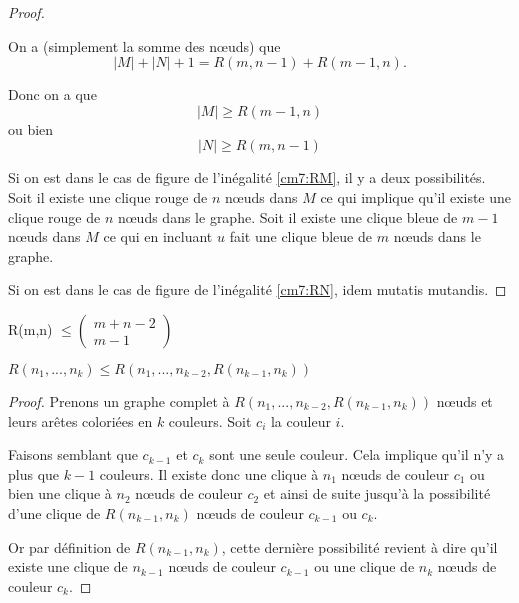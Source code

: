 \begin{mytheo} 
\begin{proof}
\begin{figure} [!h]
\end{figure}   
     
 On a (simplement la somme des nœuds) que
 $$|M|+|N|+1 = R(m,n-1) + R(m-1,n).$$
 
 Donc on a que
 \begin{equation} \label{cm7:RM}
 |M| \geq R(m-1,n)
\end{equation}
ou bien
\begin{equation} \label{cm7:RN}
 |N| \geq R(m,n-1)
\end{equation}

Si on est dans le cas de figure de l'inégalité \ref{cm7:RM}, il y a deux possibilités. Soit il existe une clique rouge de $n$ nœuds dans $M$ ce qui implique qu'il existe une clique rouge de $n$ nœuds dans le graphe. Soit il existe une clique bleue de $m-1$ nœuds dans $M$ ce qui en incluant $u$ fait une clique bleue de $m$ nœuds dans le graphe.

Si on est dans le cas de figure de l'inégalité \ref{cm7:RN}, idem mutatis mutandis.
  \end{proof}
\end{mytheo}

\begin{mycorr} R(m,n) $\leq \begin{pmatrix}
m+n-2\\
m-1
\end{pmatrix}$\\
\end{mycorr}

\begin{mytheo}
$R(n_1,...,n_k) \leq R \left( n_1,...,n_{k-2},R(n_{k-1},n_k) \right)$

\begin{proof}
  Prenons un graphe complet à $R(n_1, ..., n_{k-2}, R(n_{k-1}, n_k))$ nœuds et leurs arêtes coloriées en $k$ couleurs. Soit $c_i $ la couleur $i$.
  
  Faisons semblant que $c_{k-1}$ et $c_{k}$ sont une seule couleur. Cela implique qu'il n'y a plus que $k-1$ couleurs. Il existe donc une clique à $n_1$ nœuds de couleur $c_1$ ou bien une clique à $n_2$ nœuds de couleur $c_2$ et ainsi de suite jusqu'à la possibilité d'une clique de $R(n_{k-1}, n_k)$ nœuds de couleur $c_{k-1}$ ou $c_{k}$.
  
  Or par définition de $R(n_{k-1}, n_k)$, cette dernière possibilité revient à dire qu'il existe une clique de $n_{k-1}$ nœuds de couleur $c_{k-1}$ ou une clique de $n_{k}$ nœuds de couleur $c_{k}$.
\end{proof}
\end{mytheo}

